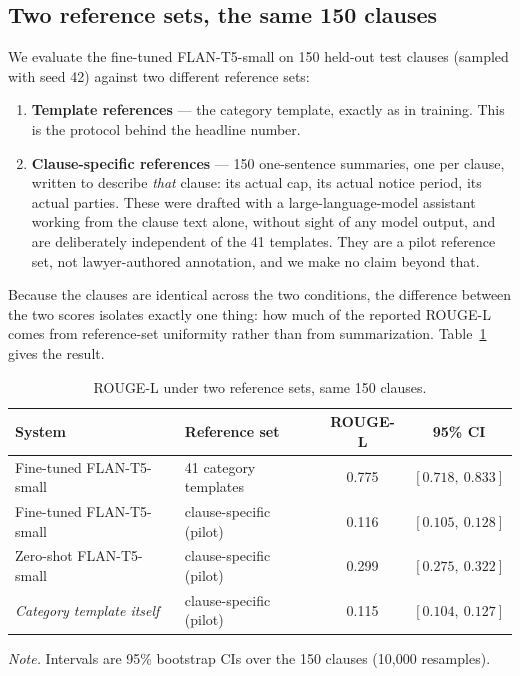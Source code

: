 \subsection{Two reference sets, the same 150 clauses}
We evaluate the fine-tuned FLAN-T5-small on 150 held-out test clauses (sampled with seed 42) against two different reference sets:

\begin{enumerate}[itemsep=2pt]
  \item \textbf{Template references} --- the category template, exactly as in training. This is the protocol behind the headline number.
  \item \textbf{Clause-specific references} --- 150 one-sentence summaries, one per clause, written to describe \emph{that} clause: its actual cap, its actual notice period, its actual parties. These were drafted with a large-language-model assistant working from the clause text alone, without sight of any model output, and are deliberately independent of the 41 templates. They are a pilot reference set, not lawyer-authored annotation, and we make no claim beyond that.
\end{enumerate}

Because the clauses are identical across the two conditions, the difference between the two scores isolates exactly one thing: how much of the reported ROUGE-L comes from reference-set uniformity rather than from summarization. Table~\ref{tab:sumeval} gives the result.

\begin{table}[ht]
\centering
\caption{ROUGE-L under two reference sets, same 150 clauses.}
\label{tab:sumeval}
\small
\begin{tabular}{llcc}
\toprule
\textbf{System} & \textbf{Reference set} & \textbf{ROUGE-L} & \textbf{95\% CI}\\
\midrule
Fine-tuned FLAN-T5-small & 41 category templates    & 0.775 & $[0.718,\ 0.833]$\\
Fine-tuned FLAN-T5-small & clause-specific (pilot)  & 0.116 & $[0.105,\ 0.128]$\\
Zero-shot FLAN-T5-small  & clause-specific (pilot)  & 0.299 & $[0.275,\ 0.322]$\\
\midrule
\emph{Category template itself} & clause-specific (pilot) & 0.115 & $[0.104,\ 0.127]$\\
\bottomrule
\end{tabular}

{\footnotesize\singlespacing \emph{Note.} Intervals are 95\% bootstrap CIs over the 150 clauses (10{,}000 resamples).\par}
\end{table}

